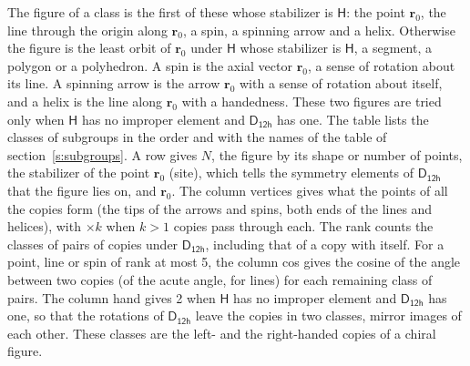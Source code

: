 \documentclass[10pt,a4paper]{article}
\numberwithin{equation}{section}
\newcommand{\grp}[1]{\mathsf{#1}}
\newcommand{\pointr}{\mathbf{r}}
\begin{document}
\leavevmode\label{n:head.figure}The figure of a class is the first of these whose stabilizer is $\grp{H}$: the point $\pointr_0$, the line through the origin along $\pointr_0$, a spin, a spinning arrow and a helix. Otherwise the figure is the least orbit of $\pointr_0$ under $\grp{H}$ whose stabilizer is $\grp{H}$, a segment, a polygon or a polyhedron. A spin is the axial vector $\pointr_0$, a sense of rotation about its line. A spinning arrow is the arrow $\pointr_0$ with a sense of rotation about itself, and a helix is the line along $\pointr_0$ with a handedness. These two figures are tried only when $\grp{H}$ has no improper element and $\grp{D_{12h}}$ has one. The table lists the classes of subgroups in the order and with the names of the table of section~\ref{s:subgroups}. \label{n:head.site}A row gives $N$, the figure by its shape or number of points, the stabilizer of the point $\pointr_0$ (site), which tells the symmetry elements of $\grp{D_{12h}}$ that the figure lies on, and $\pointr_0$. \label{n:head.vertices}The column vertices gives what the points of all the copies form (the tips of the arrows and spins, both ends of the lines and helices), with ${\times}k$ when $k > 1$ copies pass through each. \label{n:head.rank}The rank counts the classes of pairs of copies under $\grp{D_{12h}}$, including that of a copy with itself. \label{n:head.cos}For a point, line or spin of rank at most 5, the column cos gives the cosine of the angle between two copies (of the acute angle, for lines) for each remaining class of pairs. \label{n:head.hand}The column hand gives 2 when $\grp{H}$ has no improper element and $\grp{D_{12h}}$ has one, so that the rotations of $\grp{D_{12h}}$ leave the copies in two classes, mirror images of each other. These classes are the left- and the right-handed copies of a chiral figure.
\end{document}
